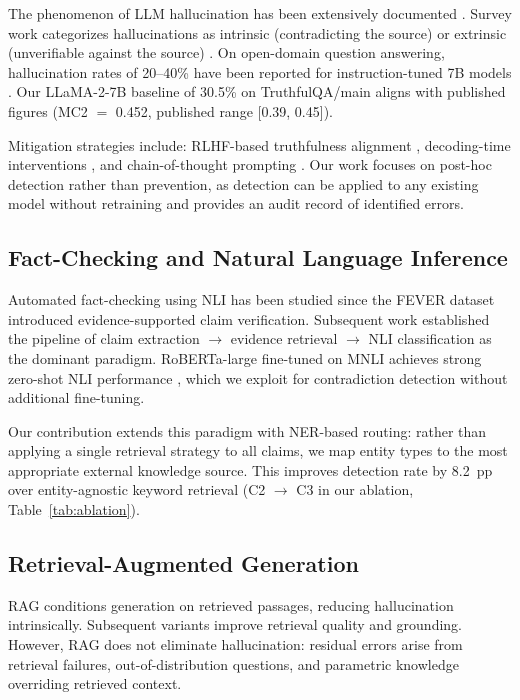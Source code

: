 \documentclass[11pt,a4paper]{article}
\begin{document}
The phenomenon of LLM hallucination has been extensively documented
\citep{ji2023survey,bang2023multitask}. Survey work categorizes hallucinations
as intrinsic (contradicting the source) or extrinsic (unverifiable against the
source) \citep{maynez2020faithfulness}. On open-domain question answering,
hallucination rates of 20--40\% have been reported for instruction-tuned 7B
models \citep{lin2022truthfulqa,touvron2023llama2}. Our LLaMA-2-7B baseline of
30.5\% on TruthfulQA/main aligns with published figures
(MC2 $=$ 0.452, published range [0.39, 0.45]).

Mitigation strategies include: RLHF-based truthfulness alignment
\citep{ouyang2022training}, decoding-time interventions \citep{chuang2023dola},
and chain-of-thought prompting \citep{wei2022chain}. Our work focuses on
post-hoc detection rather than prevention, as detection can be applied to any
existing model without retraining and provides an audit record of identified
errors.

\subsection{Fact-Checking and Natural Language Inference}

Automated fact-checking using NLI has been studied since the FEVER dataset
\citep{thorne2018fever} introduced evidence-supported claim verification.
Subsequent work \citep{popat2018declare,wadden2020fact} established the pipeline
of claim extraction $\to$ evidence retrieval $\to$ NLI classification as the
dominant paradigm. RoBERTa-large fine-tuned on MNLI
\citep{williams2018broad,liu2019roberta} achieves strong zero-shot NLI
performance \citep{yin2019benchmarking}, which we exploit for contradiction
detection without additional fine-tuning.

Our contribution extends this paradigm with NER-based routing: rather than
applying a single retrieval strategy to all claims, we map entity types to the
most appropriate external knowledge source. This improves detection rate by
8.2~pp over entity-agnostic keyword retrieval (C2 $\to$ C3 in our ablation,
Table~\ref{tab:ablation}).

\subsection{Retrieval-Augmented Generation}

RAG \citep{lewis2020rag} conditions generation on retrieved passages, reducing
hallucination intrinsically. Subsequent variants \citep{izacard2021leveraging,
shi2023replug} improve retrieval quality and grounding. However, RAG does not
eliminate hallucination: residual errors arise from retrieval failures,
out-of-distribution questions, and parametric knowledge overriding retrieved
context.
\end{document}
